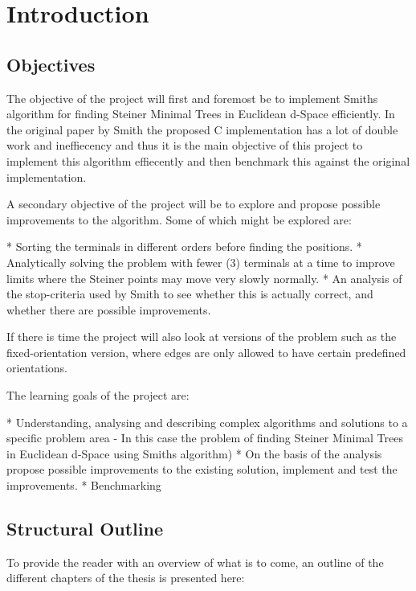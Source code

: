 {
\abnormalparskip{0pt}
\chapter{Introduction}
\label{cha:introduction}
}


\section{Objectives}
\label{sec:objectives}

The objective of the project will first and foremost be to implement Smiths
algorithm for finding Steiner Minimal Trees in Euclidean d-Space efficiently. In
the original paper by Smith the proposed C implementation has a lot of
double work and ineffiecency and thus it is the main objective of this project
to implement this algorithm effiecently and then benchmark this against the
original implementation.

A secondary objective of the project will be to explore and propose possible
improvements to the algorithm. Some of which might be explored are:

* Sorting the terminals in  different orders before finding the positions.
* Analytically solving the problem with fewer (3) terminals at a time to improve
  limits where the Steiner points may move very slowly normally.
* An analysis of the stop-criteria used by Smith to see whether this is actually
  correct, and whether there are possible improvements.

If there is time the project will also look at versions of the problem such as
the fixed-orientation version, where edges are only allowed to have certain
predefined orientations.

The learning goals of the project are:

* Understanding, analysing and describing complex algorithms and solutions to a
  specific problem area
    - In this case the problem of finding Steiner Minimal Trees
      in Euclidean d-Space using Smiths algorithm)
* On the basis of the analysis propose possible improvements to the existing
  solution, implement and test the improvements.
* Benchmarking

\section{Structural Outline}
\label{sec:structural-outline}

To provide the reader with an overview of what is to come, an
outline of the different chapters of the thesis is presented here:

